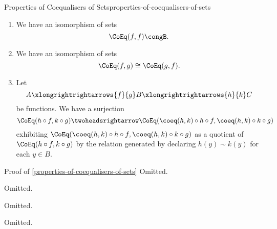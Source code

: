 \begin{proposition}{Properties of Coequalisers of Sets}{properties-of-coequalisers-of-sets}
\begin{enumerate}
\[\begin{tikzcd}[row sep={5.0*\the\DL,between origins}, column sep={4.0*\the\DL,between origins}, background color=backgroundColor, ampersand replacement=\&]
                    A%
                    \arrow[r,"f",shift left=2.0]%
                    \arrow[r,"g"description]%
                    \arrow[r,"h"',shift right=2.0]%
                    \&
                    B%
                \end{tikzcd}
            \]%
            in $\Sets$.
        \item\label{properties-of-coequalisers-of-sets-unitality}We have an isomorphism of sets
            \[
                \CoEq(f,f)%
                \cong%
                B.%
            \]%
        \item\label{properties-of-coequalisers-of-sets-commutativity}We have an isomorphism of sets
            \[
                \CoEq(f,g)
                \cong
                \CoEq(g,f).
            \]%
        \item\label{properties-of-coequalisers-of-sets-interaction-with-composition}Let
            \[
                A
                \xlongrightrightarrows{f}{g}
                B
                \xlongrightrightarrows{h}{k}
                C
            \]%
            be functions. We have a surjection
            \[
                \CoEq(h\circ f,k\circ g)%
                \twoheadsrightarrow%
                \CoEq(\coeq(h,k)\circ h\circ f,\coeq(h,k)\circ k\circ g)%
            \]%
            exhibiting $\CoEq(\coeq(h,k)\circ h\circ f,\coeq(h,k)\circ k\circ g)$ as a quotient of $\CoEq(h\circ f,k\circ g)$ by the relation generated by declaring $h(y)\sim k(y)$ for each $y\in B$.
    \end{enumerate}
\end{proposition}
\begin{Proof}{Proof of \cref{properties-of-coequalisers-of-sets}}%
    Omitted.

    Omitted.

    Omitted.

    Omitted.
\end{Proof}
